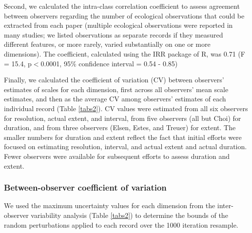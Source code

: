 \documentclass[12pt]{article}
\begin{document}
Second, we calculated the intra-class correlation coefficient \cite{bartko_intraclass_1966} to assess agreement between observers regarding the number of ecological observations that could be extracted from each paper (multiple ecological observations were reported in many studies; we listed observations as separate records if they measured different features, or more rarely, varied substantially on one or more dimensions).  The coefficient, calculated using the IRR package \cite{gamer_irr:_2012} of R, was 0.71 (F = 15.4, p$<$0.0001, 95\% confidence interval = 0.54 - 0.85)  

Finally, we calculated the coefficient of variation (CV) between observers' estimates of scales for each dimension, first across all observers' mean scale estimates, and then as the average CV among observers' estimates of each individual record (Table \ref{tabs2}). CV values were estimated from all six observers for resolution, actual extent, and interval, from five observers (all but Choi) for duration, and from three observers (Elsen, Estes, and Treuer) for extent. The smaller numbers for duration and extent reflect the fact that initial efforts were focused on estimating resolution, interval, and actual extent and actual duration. Fewer observers were available for subsequent efforts to assess duration and extent. 

\subsubsection*{Between-observer coefficient of variation}
\vspace{-10pt}
We used the maximum uncertainty values for each dimension from the inter-observer variability analysis (Table \ref{tabs2}) to determine the bounds of the random perturbations applied to each record over the 1000 iteration resample.  
\end{document}
